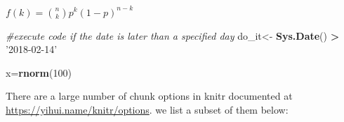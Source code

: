 \documentclass[]{article}
\newenvironment{Shaded}{\begin{snugshade}}{\end{snugshade}}
\newcommand{\KeywordTok}[1]{\textcolor[rgb]{0.13,0.29,0.53}{\textbf{#1}}}
\newcommand{\DecValTok}[1]{\textcolor[rgb]{0.00,0.00,0.81}{#1}}
\newcommand{\StringTok}[1]{\textcolor[rgb]{0.31,0.60,0.02}{#1}}
\newcommand{\CommentTok}[1]{\textcolor[rgb]{0.56,0.35,0.01}{\textit{#1}}}
\newcommand{\OperatorTok}[1]{\textcolor[rgb]{0.81,0.36,0.00}{\textbf{#1}}}
\newcommand{\NormalTok}[1]{#1}
\begin{document}
\begin{Shaded}
\end{Shaded}

\(f(k) = {n \choose k} p^{k} (1-p)^{n-k}\)

\begin{Shaded}
\begin{Highlighting}[]
\CommentTok{#execute code if the date is later than a specified day}
\NormalTok{do_it<-}\StringTok{ }\KeywordTok{Sys.Date}\NormalTok{() }\OperatorTok{>}\StringTok{ '2018-02-14'}
\end{Highlighting}
\end{Shaded}

\begin{Shaded}
\begin{Highlighting}[]
\NormalTok{x=}\KeywordTok{rnorm}\NormalTok{(}\DecValTok{100}\NormalTok{)}
\end{Highlighting}
\end{Shaded}

There are a large number of chunk options in knitr documented at
\url{https://yihui.name/knitr/options}. we list a subset of them below:
\end{document}
